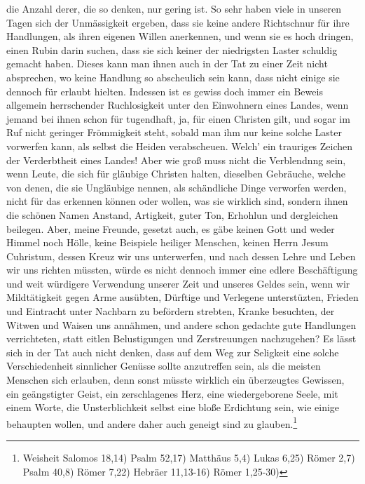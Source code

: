 die Anzahl derer, die so denken, nur gering ist. So sehr haben viele in unseren
Tagen sich der Unmässigkeit ergeben, dass sie keine andere Richtschnur für ihre
Handlungen, als ihren eigenen Willen anerkennen, und wenn sie es hoch dringen,
einen Rubin darin suchen, dass sie sich keiner der niedrigsten Laster schuldig
gemacht haben. Dieses kann man ihnen auch in der Tat zu einer Zeit nicht
absprechen, wo keine Handlung so abscheulich sein kann, dass nicht einige sie
dennoch für erlaubt hielten. Indessen ist es gewiss doch immer ein Beweis
allgemein herrschender Ruchlosigkeit unter den Einwohnern eines Landes, wenn
jemand bei ihnen schon für tugendhaft, ja, für einen Christen gilt, und sogar im
Ruf nicht geringer Frömmigkeit steht, sobald man ihm nur keine solche Laster
vorwerfen kann, als selbst die Heiden verabscheuen.
Welch' ein trauriges
Zeichen
der Verderbtheit eines Landes! Aber wie groß muss
nicht die Verblendnng sein,
wenn Leute, die sich für gläubige Christen halten, dieselben Gebräuche, welche
von denen, die sie Ungläubige nennen, als schändliche Dinge verworfen werden,
nicht für das erkennen können oder wollen, was sie wirklich sind, sondern ihnen
die schönen Namen Anstand, Artigkeit, guter Ton, Erhohlun und dergleichen
beilegen.
Aber, meine Freunde, gesetzt auch, es gäbe keinen Gott und weder Himmel noch
Hölle, keine Beispiele heiliger Menschen, keinen Herrn Jesum Cuhristum, dessen
Kreuz wir uns unterwerfen, und nach dessen Lehre und Leben
wir uns richten
müssten, würde es nicht dennoch immer eine edlere Beschäftigung und weit
würdigere Verwendung unserer Zeit und unseres Geldes sein, wenn wir
Mildtätigkeit gegen Arme ausübten, Dürftige und Verlegene
unterstüzten,
Frieden und Eintracht unter Nachbarn zu befördern strebten, Kranke besuchten,
der Witwen und Waisen uns annähmen, und andere schon gedachte gute Handlungen
verrichteten, statt eitlen Belustigungen und Zerstreuungen nachzugehen? Es lässt
sich in der Tat auch nicht denken, dass auf dem Weg zur Seligkeit eine solche
Verschiedenheit sinnlicher Genüsse sollte anzutreffen sein, als die meisten
Menschen sich erlauben, denn sonst müsste wirklich ein überzeugtes Gewissen, ein
geängstigter Geist, ein zerschlagenes Herz, eine wiedergeborene Seele, mit
einem Worte, die Unsterblichkeit selbst eine bloße Erdichtung sein, wie einige
behaupten wollen, und andere daher auch geneigt sind zu
glauben.\footnote{Weisheit Salomos 18,14)
Psalm 52,17)
Matthäus 5,4)
Lukas 6,25)
Römer 2,7)
Psalm 40,8)
Römer 7,22)
Hebräer 11,13-16)
Römer 1,25-30)}
